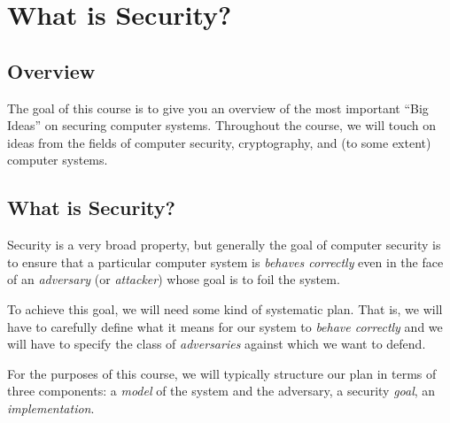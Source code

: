 \chapter{What is Security?}

\section{Overview}

The goal of this course is to give you an overview of the 
most important ``Big Ideas'' on securing computer systems.
Throughout the course, we will touch on ideas from the fields
of computer security, cryptography, and (to some extent)
computer systems.



\iffalse
\textbf{Big Idea}: Big ideas for securing computers.
\begin{itemize}
	\item Lectures: ask questions!
	\item Labs (coding) + psets (theory)
	\item Midterm + final
\end{itemize}
\fi

\section{What is Security?}
Security is a very broad property, but generally
the goal of computer security 
is to ensure that a particular computer system is 
\emph{behaves correctly} even in the
face of an \emph{adversary} (or \emph{attacker}) whose goal is to foil the
system.

To achieve this goal, we will need some kind of
systematic plan.
That is, we will have to carefully define 
what it means for our system to \emph{behave correctly}
and we will have to specify the class of 
\emph{adversaries} against which we want to defend.

For the purposes of this course, we will typically
structure our plan in terms of three components:
a \emph{model} of the system and the adversary,
a security \emph{goal}, 
an \emph{implementation}.

